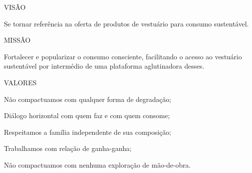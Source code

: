 \noindent VISÃO \par
Se tornar referência na oferta de produtos de vestuário para consumo sustentável.\par
\noindent MISSÃO \par
Fortalecer e popularizar o consumo consciente, facilitando o acesso ao vestuário 
sustentável por intermédio de uma plataforma aglutinadora desses.\par
\noindent VALORES \par
Não compactuamos com qualquer forma de degradação;\par
Diálogo horizontal com quem faz e com quem consome;\par
Respeitamos a família independente de sua composição;\par
Trabalhamos com relação de ganha-ganha;\par
Não compactuamos com nenhuma exploração de mão-de-obra.\par
